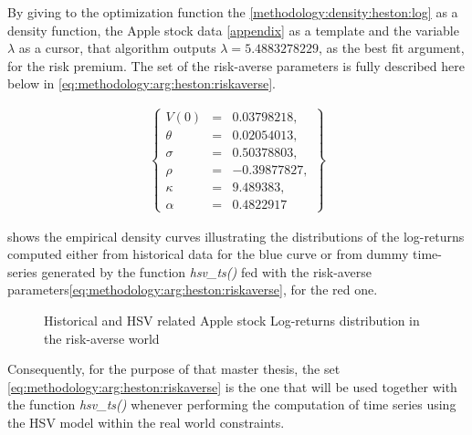 \documentclass[12pt]{report}
\begin{document}
By giving to the optimization function the \cref{methodology:density:heston:log} as a density function, the Apple stock data \cref{appendix} as a template and the variable $\lambda$ as a cursor, that algorithm outputs $\lambda = 5.4883278229$, as the best fit argument, for the risk premium.
The set of the risk-averse parameters is fully described here below in \ref{eq:methodology:arg:heston:riskaverse}.

\begin{align}
  \left \{
  \begin{array}{lcl}
    V(0) &= &0.03798218, \\
    \theta &= &0.02054013, \\
    \sigma &= &0.50378803, \\
    \rho &= &-0.39877827, \\
    \kappa &= &9.489383, \\
    \alpha & = &0.4822917
  \end{array}
  \right \}  
  \label{eq:methodology:arg:heston:riskaverse}
\end{align}


 shows the empirical density curves illustrating the distributions of the log-returns computed either from historical data for the blue curve or from dummy time-series generated by the function \textit{hsv\_ts()} fed with the risk-averse parameters\ref{eq:methodology:arg:heston:riskaverse}, for the red one.


\begin{figure}[ht]
  \centering
  
  \caption{Historical and HSV related Apple stock Log-returns distribution in the risk-averse world}
  \label{p:methodology:density:aapl:heston:riskaverse}
\end{figure}

Consequently, for the purpose of that master thesis, the set \ref{eq:methodology:arg:heston:riskaverse} is the one that will be used together with the function \textit{hsv\_ts()} whenever performing the computation of time series using the HSV model within the real world constraints.
\end{document}
